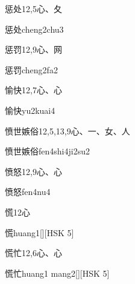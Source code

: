 \begin{entry}{惩处}{12,5}{⼼、⼡}
  \begin{phonetics}{惩处}{cheng2chu3}
  \end{phonetics}
\end{entry}

\begin{entry}{惩罚}{12,9}{⼼、⽹}
  \begin{phonetics}{惩罚}{cheng2fa2}
  \end{phonetics}
\end{entry}

\begin{entry}{愉快}{12,7}{⼼、⼼}
  \begin{phonetics}{愉快}{yu2kuai4}
  \end{phonetics}
\end{entry}

\begin{entry}{愤世嫉俗}{12,5,13,9}{⼼、⼀、⼥、⼈}
  \begin{phonetics}{愤世嫉俗}{fen4shi4ji2su2}
  \end{phonetics}
\end{entry}

\begin{entry}{愤怒}{12,9}{⼼、⼼}
  \begin{phonetics}{愤怒}{fen4nu4}
  \end{phonetics}
\end{entry}

\begin{entry}{慌}{12}{⼼}
  \begin{phonetics}{慌}{huang1}[][HSK 5]
  \end{phonetics}
\end{entry}

\begin{entry}{慌忙}{12,6}{⼼、⼼}
  \begin{phonetics}{慌忙}{huang1 mang2}[][HSK 5]
  \end{phonetics}
\end{entry}

